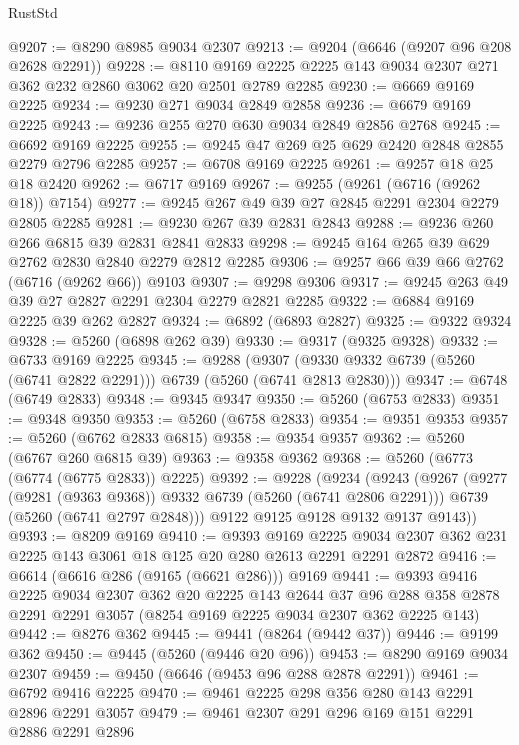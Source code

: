 \begin{lexlean}{RustStd}
\begin{coremodule}
@9207 := @8290 @8985 @9034 @2307
@9213 := @9204 (@6646 (@9207 @96 @208 @2628 @2291))
@9228 := @8110 @9169 @2225 @2225 @143 @9034 @2307 @271 @362 @232 @2860 @3062 @20 @2501 @2789 @2285
@9230 := @6669 @9169 @2225
@9234 := @9230 @271 @9034 @2849 @2858
@9236 := @6679 @9169 @2225
@9243 := @9236 @255 @270 @630 @9034 @2849 @2856 @2768
@9245 := @6692 @9169 @2225
@9255 := @9245 @47 @269 @25 @629 @2420 @2848 @2855 @2279 @2796 @2285
@9257 := @6708 @9169 @2225
@9261 := @9257 @18 @25 @18 @2420
@9262 := @6717 @9169
@9267 := @9255 (@9261 (@6716 (@9262 @18)) @7154)
@9277 := @9245 @267 @49 @39 @27 @2845 @2291 @2304 @2279 @2805 @2285
@9281 := @9230 @267 @39 @2831 @2843
@9288 := @9236 @260 @266 @6815 @39 @2831 @2841 @2833
@9298 := @9245 @164 @265 @39 @629 @2762 @2830 @2840 @2279 @2812 @2285
@9306 := @9257 @66 @39 @66 @2762 (@6716 (@9262 @66)) @9103
@9307 := @9298 @9306
@9317 := @9245 @263 @49 @39 @27 @2827 @2291 @2304 @2279 @2821 @2285
@9322 := @6884 @9169 @2225 @39 @262 @2827
@9324 := @6892 (@6893 @2827)
@9325 := @9322 @9324
@9328 := @5260 (@6898 @262 @39)
@9330 := @9317 (@9325 @9328)
@9332 := @6733 @9169 @2225
@9345 := @9288
    (@9307 (@9330 @9332 @6739 (@5260 (@6741 @2822 @2291))) @6739 (@5260 (@6741 @2813 @2830)))
@9347 := @6748 (@6749 @2833)
@9348 := @9345 @9347
@9350 := @5260 (@6753 @2833)
@9351 := @9348 @9350
@9353 := @5260 (@6758 @2833)
@9354 := @9351 @9353
@9357 := @5260 (@6762 @2833 @6815)
@9358 := @9354 @9357
@9362 := @5260 (@6767 @260 @6815 @39)
@9363 := @9358 @9362
@9368 := @5260 (@6773 (@6774 (@6775 @2833)) @2225)
@9392 := @9228
    (@9234
      (@9243
        (@9267
          (@9277 (@9281 (@9363 @9368)) @9332 @6739 (@5260 (@6741 @2806 @2291)))
          @6739
          (@5260 (@6741 @2797 @2848)))
        @9122
        @9125
        @9128
        @9132
        @9137
        @9143))
@9393 := @8209 @9169
@9410 := @9393
    @9169
    @2225
    @9034
    @2307
    @362
    @231
    @2225
    @143
    @3061
    @18
    @125
    @20
    @280
    @2613
    @2291
    @2291
    @2872
@9416 := @6614 (@6616 @286 (@9165 (@6621 @286))) @9169
@9441 := @9393
    @9416
    @2225
    @9034
    @2307
    @362
    @20
    @2225
    @143
    @2644
    @37
    @96
    @288
    @358
    @2878
    @2291
    @2291
    @3057
    (@8254 @9169 @2225 @9034 @2307 @362 @2225 @143)
@9442 := @8276 @362
@9445 := @9441 (@8264 (@9442 @37))
@9446 := @9199 @362
@9450 := @9445 (@5260 (@9446 @20 @96))
@9453 := @8290 @9169 @9034 @2307
@9459 := @9450 (@6646 (@9453 @96 @288 @2878 @2291))
@9461 := @6792 @9416 @2225
@9470 := @9461 @2225 @298 @356 @280 @143 @2291 @2896 @2291 @3057
@9479 := @9461 @2307 @291 @296 @169 @151 @2291 @2886 @2291 @2896

\end{coremodule}
\end{lexlean}
